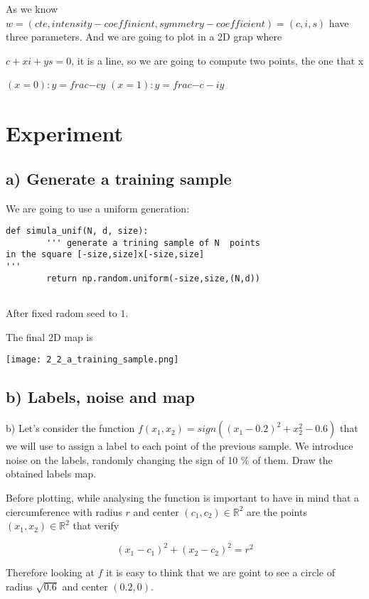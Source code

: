 As we know $w = ( cte, intensity-coeffinient, symmetry-coefficient) = (c,i,s)$ have three parameters. And we are going to plot in a 2D grap where

$c + x i + y s = 0$, it is a line, so we are going to compute two points, the one that x 

$(x = 0): y = frac{-c}{y}$
$(x=1): y = frac{-c - i}{y}$



\section{Experiment }

\subsection{a) Generate a training sample}

We are going to use a uniform generation:

\begin{verbatim}
def simula_unif(N, d, size):
        ''' generate a trining sample of N  points
in the square [-size,size]x[-size,size]
'''
        return np.random.uniform(-size,size,(N,d))
 
\end{verbatim}

After fixed radom seed to $1$.

The final 2D map  is

\texttt{[image: 2\_2\_a\_training\_sample.png]}

\subsection{b) Labels, noise and map}

b) Let's consider the function $f(x_1, x_2) = sign((x_1 - 0.2)^2 + x_2^2 - 0.6)$ that we will use to assign a label to each point of the previous sample. We introduce noise on the labels, randomly changing the sign of 10 \% of them.
Draw the obtained labels map.


Before plotting, while analysing the function is important to have in mind that a ciercumference with radius $r$ and center $(c_1, c_2) \in \mathbb R^2$ are the points $(x_1, x_2) \in \mathbb R^2$ that verify 

\[ (x_1 - c_1)^2 + (x_2 - c_2)^2 = r^2\]

Therefore looking at $f$ it is easy to think that we are goint to see a circle of radius $\sqrt{0.6}$ and center $(0.2, 0)$.

